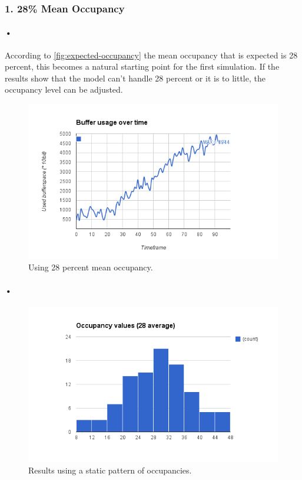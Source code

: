 \documentclass[a4paper, 12pt]{report}
\begin{document}
\subsubsection{1. 28\% Mean Occupancy}

\paragraph{•}
According to \ref{fig:expected-occupancy} the mean occupancy that is expected is 28 percent, this becomes a natural starting point for the first simulation.
If the results show that the model can't handle 28 percent or it is to little, the occupancy level can be adjusted.

\begin{figure}[h!]
	\centering
		\includegraphics[width=1.0\textwidth]{images/mean-28.png}
		\caption{Using 28 percent mean occupancy.}
		\label{fig:28-occ}
\end{figure}

\paragraph{•}


\begin{figure}[h!]
	\centering
		\includegraphics[width=1.0\textwidth]{images/occupancy-28.png}
		\caption{Results using a static pattern of occupancies.}
		\label{fig:increasing-occ}
\end{figure}
\end{document}
